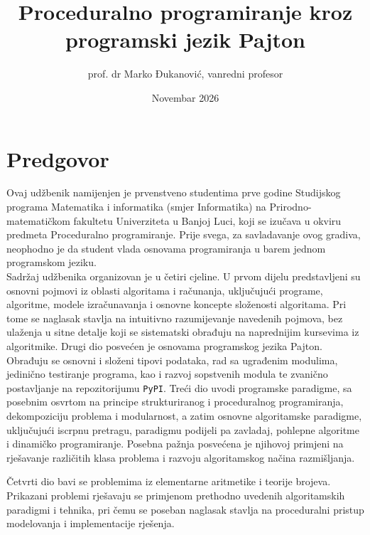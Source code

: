 \documentclass[b5paper, utf8, 11pt, colorlinks]{book}
\begin{document}
\author{prof. dr Marko Đukanović, vanredni profesor}
\title{Proceduralno programiranje kroz programski jezik Pajton}
\date{Novembar 2026}

 
\maketitle
 
\tableofcontents
 \clearpage
 \setcounter{page}{1}

\chapter*{Predgovor}

Ovaj udžbenik namijenjen je prvenstveno studentima prve godine Studijskog programa Matematika i informatika (smjer Informatika) na Prirodno-matematičkom fakultetu Univerziteta u Banjoj Luci, koji se izučava u okviru predmeta Proceduralno programiranje. Prije svega, za savladavanje ovog gradiva,  neophodno je da student vlada  osnovama programiranja u barem jednom programskom jeziku.  \\ 


Sadržaj udžbenika organizovan je u četiri cjeline. U prvom dijelu predstavljeni su osnovni pojmovi iz oblasti algoritama i računanja, uključujući programe, algoritme, modele izračunavanja i osnovne koncepte složenosti algoritama. Pri tome se naglasak stavlja na intuitivno razumijevanje navedenih pojmova, bez ulaženja u sitne detalje koji se sistematski obrađuju na naprednijim kursevima iz algoritmike. Drugi dio posvećen je osnovama programskog jezika Pajton. Obrađuju se osnovni i složeni tipovi podataka, rad sa ugrađenim modulima, jedinično testiranje programa, kao i razvoj sopstvenih modula te zvanično postavljanje na repozitorijumu \texttt{PyPI}.  Treći dio uvodi programske paradigme, sa posebnim osvrtom na principe strukturiranog i proceduralnog programiranja, dekompoziciju problema i modularnost, a zatim osnovne algoritamske paradigme, uključujući iscrpnu pretragu, paradigmu podijeli pa zavladaj, pohlepne algoritme i dinamičko programiranje. Posebna pažnja posvećena je njihovoj primjeni na rješavanje različitih klasa problema i razvoju algoritamskog načina razmišljanja.

Četvrti dio bavi se problemima iz elementarne aritmetike i teorije brojeva. Prikazani problemi rješavaju se primjenom prethodno uvedenih algoritamskih paradigmi i tehnika, pri čemu se poseban naglasak stavlja na proceduralni pristup modelovanja i implementacije rješenja.
\end{document}
